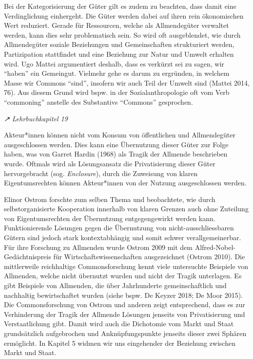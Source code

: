 \documentclass[
  nswissgerman,
  a4paper,
  DIV=11,
  numbers=noendperiod,
  oneside,
  openany]{scrreprt}
\begin{document}
Bei der Kategorisierung der Güter gilt es zudem zu beachten, dass damit
eine Verdinglichung einhergeht. Die Güter werden dabei auf ihren rein
ökonomischen Wert reduziert. Gerade für Ressourcen, welche als
Allmendegüter verwaltet werden, kann dies sehr problematisch sein. So
wird oft ausgeblendet, wie durch Allmendegüter soziale Beziehungen und
Gemeinschaften strukturiert werden, Partizipation stattfindet und eine
Beziehung zur Natur und Umwelt erhalten wird. Ugo Mattei argumentiert
deshalb, dass es verkürzt sei zu sagen, wir ``haben'' ein Gemeingut.
Vielmehr gehe es darum zu ergründen, in welchem Masse wir Commons
``sind'', insofern wir auch Teil der Umwelt sind (Mattei 2014, 76). Aus
diesem Grund wird bspw. in der Sozialanthropologie oft vom Verb
``commoning'' anstelle des Substantivs ``Commons'' gesprochen.

\begin{tcolorbox}[enhanced jigsaw, arc=.35mm, bottomrule=.15mm, bottomtitle=1mm, breakable, colback=white, colbacktitle=quarto-callout-tip-color!10!white, colframe=quarto-callout-tip-color-frame, coltitle=black, left=2mm, leftrule=.75mm, opacityback=0, opacitybacktitle=0.6, rightrule=.15mm, title={Die Tragik der Allmende und ihre Überwindung}, titlerule=0mm, toprule=.15mm, toptitle=1mm]

\emph{↗ Lehrbuchkapitel 19}

Akteur*innen können nicht vom Konsum von öffentlichen und Allmendegüter
ausgeschlossen werden. Dies kann eine Übernutzung dieser Güter zur Folge
haben, was von Garret Hardin (1968) als Tragik der Allmende beschrieben
wurde. Oftmals wird als Lösungsansatz die Privatisierung dieser Güter
hervorgebracht (sog. \emph{Enclosure}), durch die Zuweisung von klaren
Eigentumsrechten können Akteur*innen von der Nutzung ausgeschlossen
werden.

Elinor Ostrom forschte zum selben Thema und beobachtete, wie durch
selbstorganisierte Kooperation innerhalb von klaren Grenzen auch ohne
Zuteilung von Eigentumsrechten der Übernutzung entgegengewirkt werden
kann. Funktionierende Lösungen gegen die Übernutzung von
nicht-ausschliessbaren Gütern sind jedoch stark kontextabhängig und
somit schwer verallgemeinerbar. Für ihre Forschung zu Allmenden wurde
Ostrom 2009 mit dem Alfred-Nobel-Gedächtnispreis für
Wirtschaftswissenschaften ausgezeichnet (Ostrom 2010). Die mittlerweile
reichhaltige Commonsforschung kennt viele untersuchte Beispiele von
Allmenden, welche nicht übernutzt wurden und nicht der Tragik
unterlagen. Es gibt Beispiele von Allmenden, die über Jahrhunderte
gemeinschaftlich und nachhaltig bewirtschaftet wurden (siehe bspw. De
Keyzer 2018; De Moor 2015). Die Commonsforschung von Ostrom und anderen
zeigt entsprechend, dass es zur Verhinderung der Tragik der Allmende
Lösungen jenseits von Privatisierung und Verstaatlichung gibt. Damit
wird auch die Dichotomie vom Markt und Staat grundsätzlich aufgebrochen
und Anknüpfungspunkte jenseits dieser zwei Sphären ermöglicht. In
Kapitel 5 widmen wir uns eingehender der Beziehung zwischen Markt und
Staat.

\end{tcolorbox}
\end{document}
